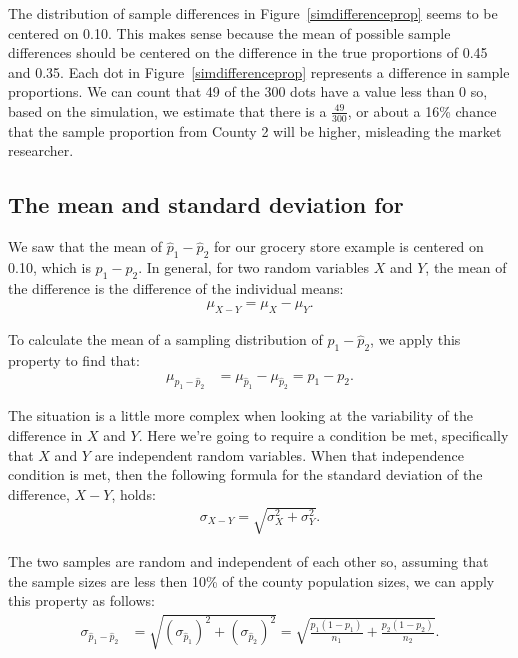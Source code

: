 The distribution of sample differences in Figure~\ref{simdifferenceprop} seems to be centered on 0.10.  This makes sense because the mean of possible sample differences should be centered on the difference in the true proportions of 0.45 and 0.35.  Each dot in Figure~\ref{simdifferenceprop} represents a difference in sample proportions.  We can count that 49 of the 300 dots have a value less than 0 so, based on the simulation, we estimate that there is a $\frac{49}{300}$, or about a 16\% chance that the sample proportion from County 2 will be higher, misleading the market researcher.


\D{\newpage}

\subsection[The mean and standard deviation for a difference in sample proportions]{The mean and standard deviation for }
\label{distributionofdifference_diff_samp_props}

We saw that the mean of $\hat{p}_1-\hat{p}_2$ for our grocery store example is centered on 0.10, which is $p_1-p_2$.  In general, for two random variables $X$ and $Y$, the mean of the difference is the difference of the individual means:
\begin{align*}
\mu_{X - Y} = \mu_X - \mu_Y.
\end{align*}

To calculate the mean of a sampling distribution of $\hat{p}_1-\hat{p}_2$, we apply this property to find that:  
\begin{align*}
\mu_{\hat{p}_1 - \hat{p}_2} &= \mu_{\hat{p}_1} - \mu_{\hat{p}_2} = p_1-p_2.
\end{align*}

The situation is a little more complex when looking at the
variability of the difference in $X$ and $Y$.
Here we're going to require a condition be met, specifically that
$X$ and $Y$ are independent random variables.
When that independence condition is met, then the following formula
for the standard deviation of the difference, $X - Y$, holds:
\begin{align*}
\sigma_{X-Y} =  \sqrt{\sigma_{X}^2 + \sigma_{Y}^2}.
\end{align*}

The two samples are random and independent of each other so, assuming that the sample sizes are less then 10\% of the county population sizes, we can apply this property as follows:  
\begin{align*}
\sigma_{\hat{p}_1 - \hat{p}_2} &=  \sqrt{(\sigma_{\hat{p}_1})^2 + (\sigma_{\hat{p}_2})^2}=  \sqrt{\frac{p_1(1-p_1)}{n_1} + \frac{p_2(1-p_2)}{n_2}}.
\end{align*}

